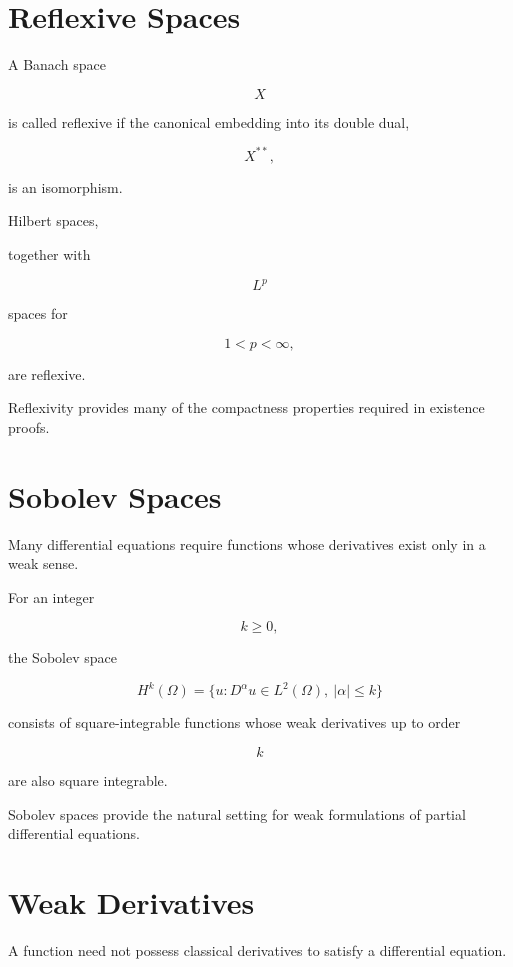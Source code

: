 \documentclass[11pt,fleqn]{book}
\numberwithin{equation}{chapter}
\theoremstyle{plain}
\theoremstyle{definition}
\theoremstyle{remark}
\begin{document}

\section{Reflexive Spaces}

A Banach space

\[
X
\]

is called reflexive if the canonical embedding into its double dual,

\[
X^{**},
\]

is an isomorphism.

Hilbert spaces,

together with

\[
L^p
\]

spaces for

\[
1<p<\infty,
\]

are reflexive.

Reflexivity provides many of the compactness properties required in
existence proofs.


\section{Sobolev Spaces}

Many differential equations require functions whose derivatives exist
only in a weak sense.

For an integer

\[
k\ge0,
\]

the Sobolev space

\[
\boxed{
H^k(\Omega)
=
\{
u
:
D^\alpha u
\in
L^2(\Omega),
\ |\alpha|\le k
\}
}
\]

consists of square-integrable functions whose weak derivatives up to
order

\[
k
\]

are also square integrable.

Sobolev spaces provide the natural setting for weak formulations of
partial differential equations.


\section{Weak Derivatives}

A function need not possess classical derivatives to satisfy a
differential equation.
\end{document}
